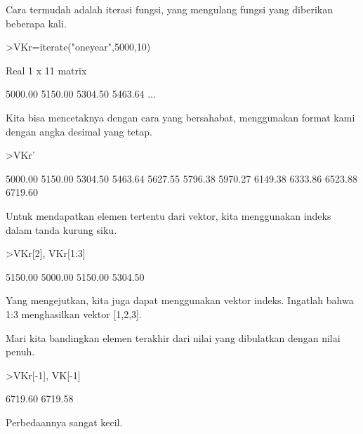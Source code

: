 \documentclass{article}
\begin{document}
\begin{eulernotebook}
\begin{eulercomment}
Cara termudah adalah iterasi fungsi, yang mengulang fungsi yang
diberikan beberapa kali.
\end{eulercomment}
\begin{eulerprompt}
>VKr=iterate("oneyear",5000,10)
\end{eulerprompt}
\begin{euleroutput}
  Real 1 x 11 matrix
  
      5000.00     5150.00     5304.50     5463.64     ...
\end{euleroutput}
\begin{eulercomment}
Kita bisa mencetaknya dengan cara yang bersahabat, menggunakan format
kami dengan angka desimal yang tetap.
\end{eulercomment}
\begin{eulerprompt}
>VKr'
\end{eulerprompt}
\begin{euleroutput}
      5000.00 
      5150.00 
      5304.50 
      5463.64 
      5627.55 
      5796.38 
      5970.27 
      6149.38 
      6333.86 
      6523.88 
      6719.60 
\end{euleroutput}
\begin{eulercomment}
Untuk mendapatkan elemen tertentu dari vektor, kita menggunakan indeks
dalam tanda kurung siku.
\end{eulercomment}
\begin{eulerprompt}
>VKr[2], VKr[1:3]
\end{eulerprompt}
\begin{euleroutput}
      5150.00 
      5000.00     5150.00     5304.50 
\end{euleroutput}
\begin{eulercomment}
Yang mengejutkan, kita juga dapat menggunakan vektor indeks. Ingatlah
bahwa 1:3 menghasilkan vektor [1,2,3].


Mari kita bandingkan elemen terakhir dari nilai yang dibulatkan dengan
nilai penuh.
\end{eulercomment}
\begin{eulerprompt}
>VKr[-1], VK[-1]
\end{eulerprompt}
\begin{euleroutput}
      6719.60 
      6719.58 
\end{euleroutput}
\begin{eulercomment}
Perbedaannya sangat kecil.


\end{eulercomment}
\end{eulernotebook}
\end{document}
